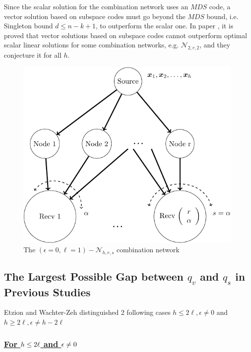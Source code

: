 Since the scalar solution for the combination network uses an $MDS$
code, a vector solution based on subspace codes must go beyond the
$MDS$ bound, i.e. Singleton bound $d\leq n-k+1$, to outperform the
scalar one. In paper \cite[Sec. IV-A, Sec. IX-1,2]{Wachter-Zeh:2018},
it is proved that vector solutions based on subspace codes cannot
outperform optimal scalar linear solutions for some combination networks,
e.g. $\mathcal{N}_{2,r,2}$, and they conjecture it for all $h$.
\begin{figure}[H]
\caption{The $\left(\epsilon=0,\ell=1\right)-\mathcal{N}_{h,r,s}$ combination
network \label{fig:network_special4}}

\centering{}\includegraphics[width=0.4\paperwidth]{./figures/nw_special4_combination}
\end{figure}


\subsection{The Largest Possible Gap between $q_{v}$ and $q_{s}$ in Previous
Studies}

Etzion and Wachter-Zeh distinguished 2 following cases $h\leq2\ell,\epsilon\neq0$
and $h\geq2\ell,\epsilon\neq h-2\ell$

\subsubsection{\uline{For \mbox{$h\protect\leq2\ell$} and \mbox{$\epsilon\protect\neq0$}}}

